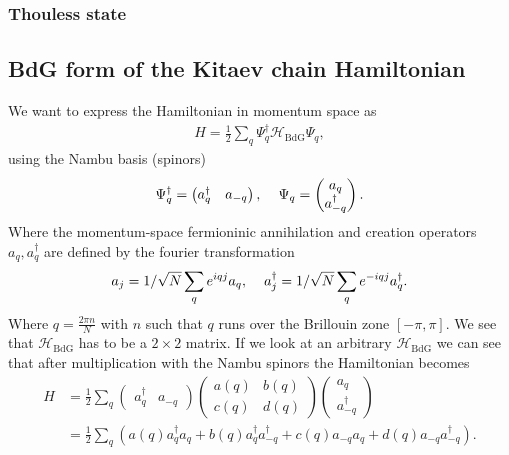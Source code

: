 \subsubsection{Thouless state}



\subsection{BdG form of the Kitaev chain Hamiltonian}
We want to express the Hamiltonian in momentum space as
\begin{align}
    H = \frac{1}{2} \sum_q \Psi_q^\dagger \mathcal{H}_\text{BdG} \Psi_q,
\end{align}
using the Nambu basis (spinors)
\begin{align}
    \Psi_q^\dagger = \begin{pmatrix}
        a_q^\dagger & a_{-q} 
    \end{pmatrix}, \hspace{4mm} \Psi_q = \begin{pmatrix}
        a_q \\
        a_{-q}^\dagger 
    \end{pmatrix}.
\end{align}
Where the momentum-space fermioninic annihilation and creation operators $a_q, a_q^\dagger$ are defined by the fourier transformation 
\begin{align}
 a_j = \frac{1}{\sqrt{N}} \sum_q e^{iqj}a_q, \hspace{4mm} a_j^\dagger = \frac{1}{\sqrt{N}} \sum_q e^{-iqj}a_q^\dagger.
\end{align}
Where $q = \frac{2 \pi n}{N}$ with $n$ such that $q$ runs over the Brillouin zone $[-\pi, \pi]$. We see that $\mathcal{H}_\text{BdG}$ has to be a $2 \times 2$ matrix. If we look at an arbitrary $\mathcal{H}_\text{BdG}$ we can see that after multiplication with the Nambu spinors the Hamiltonian becomes
\begin{align}
    H &= \frac{1}{2} \sum_q \begin{pmatrix}
        a_q^\dagger & a_{-q} 
    \end{pmatrix} \begin{pmatrix}
        a(q) & b(q)\\
        c(q) & d(q)
    \end{pmatrix}\begin{pmatrix}
        a_q \\
        a_{-q}^\dagger 
    \end{pmatrix} \\
    &= \frac{1}{2} \sum_q \left( a(q) a_q^\dagger a_q  + b(q) a_q^\dagger a_{-q}^\dagger + c(q) a_{-q} a_q + d(q) a_{-q} a_{-q}^\dagger\right).
\end{align}
